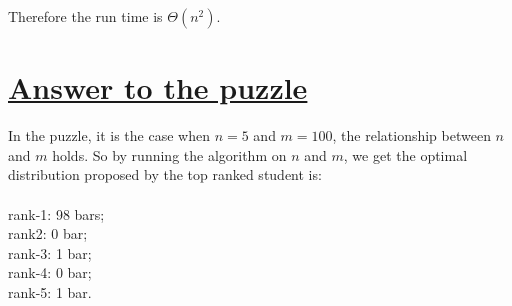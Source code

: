 \documentclass[11pt]{article}
\begin{document}
Therefore the run time is $\Theta(n^2)$.

\section*{\underline{Answer to the puzzle}}
In the puzzle, it is the case when $n=5$ and $m=100$, the relationship
between $n$ and $m$ holds. So by running the algorithm on $n$ and $m$,
we get the optimal distribution proposed by the top ranked student is:\\\\
rank-1: 98 bars;\\ rank2: 0 bar;\\ rank-3: 1 bar;\\ rank-4: 0
bar;\\ rank-5: 1 bar. 
\end{document}
